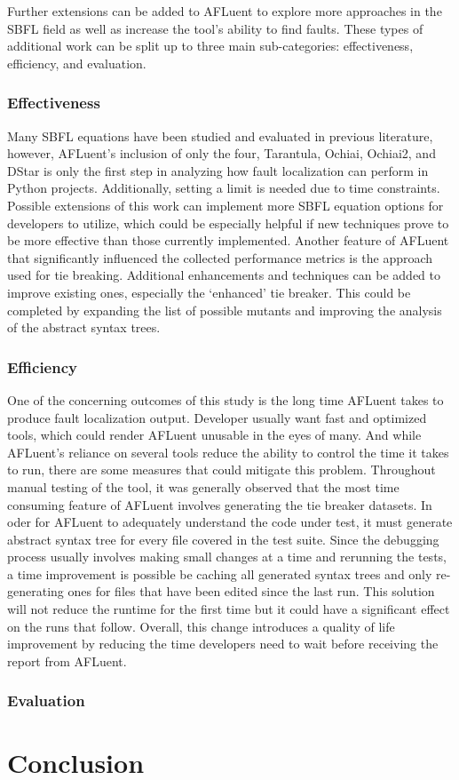 Further extensions can be added to AFLuent to explore more approaches in the
SBFL field as well as increase the tool's ability to find faults. These
types of additional work can be split up to three main sub-categories:
effectiveness, efficiency, and evaluation.

\subsubsection{Effectiveness}

Many SBFL equations have been studied and evaluated in previous literature,
however, AFLuent's inclusion of only the four, Tarantula, Ochiai, Ochiai2, and
DStar is only the first step in analyzing how fault localization can perform in
Python projects. Additionally, setting a limit is needed due to time
constraints. Possible extensions of this work can implement more SBFL equation
options for developers to utilize, which could be especially helpful if new
techniques prove to be more effective than those currently implemented. Another
feature of AFLuent that significantly influenced the collected performance
metrics is the approach used for tie breaking. Additional enhancements and
techniques can be added to improve existing ones, especially the `enhanced' tie
breaker. This could be completed by expanding the list of possible mutants and
improving the analysis of the abstract syntax trees.

\subsubsection{Efficiency}

One of the concerning outcomes of this study is the long time AFLuent takes to
produce fault localization output. Developer usually want fast and optimized
tools, which could render AFLuent unusable in the eyes of many. And while
AFLuent's reliance on several tools reduce the ability to control the time it
takes to run, there are some measures that could mitigate this problem.
Throughout manual testing of the tool, it was generally observed that the most
time consuming feature of AFLuent involves generating the tie breaker datasets.
In oder for AFLuent to adequately understand the code under test, it must
generate abstract syntax tree for every file covered in the test suite. Since
the debugging process usually involves making small changes at a time and
rerunning the tests, a time improvement is possible be caching all generated
syntax trees and only re-generating ones for files that have been edited since
the last run. This solution will not reduce the runtime for the first time but
it could have a significant effect on the runs that follow. Overall, this change
introduces a quality of life improvement by reducing the time developers need to
wait before receiving the report from AFLuent.

\subsubsection{Evaluation}

\section{Conclusion}
